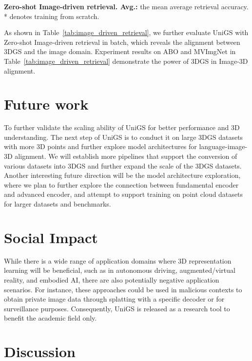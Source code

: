 \begin{table}[t]
		\caption{\textbf{Zero-shot Image-driven retrieval. Avg.: }the mean average retrieval accuracy. * denotes training from scratch. }
  \label{tab:image_driven_retrieval}
  \vspace{-6mm}
\end{table}

As shown in Table~\ref{tab:image_driven_retrieval}, we further evaluate UniGS with Zero-shot Image-driven retrieval in batch, which reveals the alignment between 3DGS and the image domain. Experiment results on ABO and MVImgNet in Table~\ref{tab:image_driven_retrieval} demonstrate the power of 3DGS in Image-3D alignment.

\section{Future work}

To further validate the scaling ability of UniGS for better performance and 3D understanding. The next step of UniGS is to conduct it on large 3DGS datasets with more 3D points and further explore model architectures for language-image-3D alignment. We will establish more pipelines that support the conversion of various datasets into 3DGS and further expand the scale of the 3DGS datasets. Another interesting future direction will be the model architecture exploration, where we plan to further explore the connection between fundamental encoder and advanced encoder, and attempt to support training on point cloud datasets for larger datasets and benchmarks.

\section{Social Impact}
\label{sec:social_impact}
While there is a wide range of application domains where 3D representation learning will be beneficial, such as in autonomous driving, augmented/virtual reality, and embodied AI, there are also potentially negative application scenarios. For instance, these approaches could be used in malicious contexts to obtain private image data through splatting with a specific decoder or for surveillance purposes. Consequently, UniGS is released as a research tool to benefit the academic field only.

\section{Discussion}
\label{sec:discussion}

